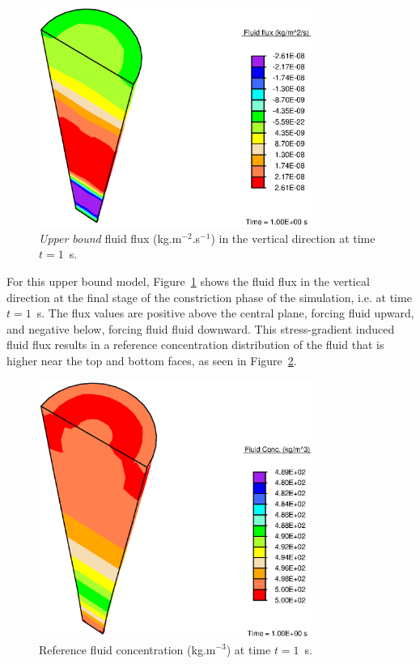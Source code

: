 \begin{figure}[!hpt]
  \centering
  \includegraphics[width=0.8\textwidth]{images/examples/lagrangian/constriction/upper-bound-flux}
  \caption{{\em Upper bound} fluid flux (kg.m$^{-2}$.s$^{-1}$) in
    the vertical direction at time $t=1$~s.}
  \label{eg2flux}
\end{figure}

\noindent For this upper bound model, Figure~\ref{eg2flux} shows the
fluid flux in the vertical direction at the final stage of the
constriction phase of the simulation, i.e. at time $t=1$~s. The flux
values are positive above the central plane, forcing fluid upward, and
negative below, forcing fluid fluid downward. This stress-gradient
induced fluid flux results in a reference concentration distribution
of the fluid that is higher near the top and bottom faces, as seen in
Figure~\ref{eg2conc}.

\begin{figure}[!hpt]
  \centering
  \includegraphics[width=0.8\textwidth]{images/examples/lagrangian/constriction/fluid-concentration}
  \caption{Reference fluid concentration (kg.m$^{-3}$) at time
    $t=1$~s.}
  \label{eg2conc}
\end{figure}


